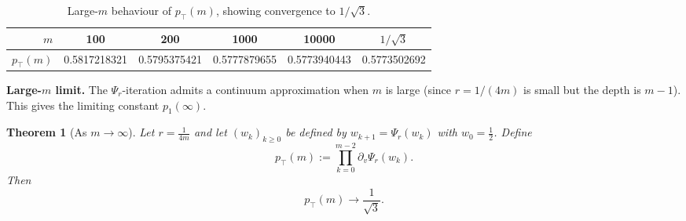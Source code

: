 \documentclass[11pt]{article}
\newtheorem{theorem}{Theorem}
\newcommand{\ptop}{p_{\top}}
\begin{document}
\begin{table}[H]
\centering
\small
\renewcommand{\arraystretch}{1.05}
\begin{tabular}{r|ccccc}
\hline
\(m\) & 100 & 200 & 1000 & 10000 & \(1/\sqrt{3}\) \\
\hline
\(\ptop(m)\) &
0.5817218321 &
0.5795375421 &
0.5777879655 &
0.5773940443 &
0.5773502692 \\
\hline
\end{tabular}
\caption{Large-\(m\) behaviour of \(\ptop(m)\), showing convergence to \(1/\sqrt{3}\).}
\label{tab:p1m-large}
\end{table}
\FloatBarrier


\noindent
\textbf{Large-\(m\) limit.}
The \(\Psi_r\)-iteration admits a continuum approximation when \(m\) is large (since \(r=1/(4m)\) is small
but the depth is \(m-1\)). This gives the limiting constant \(p_1(\infty)\).

\begin{theorem}[As $m\to\infty$]
\label{thm:p1limit}
Let \(r=\frac1{4m}\) and let \((w_k)_{k\ge0}\) be defined by \(w_{k+1}=\Psi_r(w_k)\) with
\(w_0=\frac12\). Define
\[
\ptop(m):=\prod_{k=0}^{m-2}\partial_v\Psi_r(w_k).
\]
Then
\[
\boxed{\;\;\ptop(m)\longrightarrow \frac{1}{\sqrt{3}}.\;\;}
\]
\end{theorem}
\end{document}
